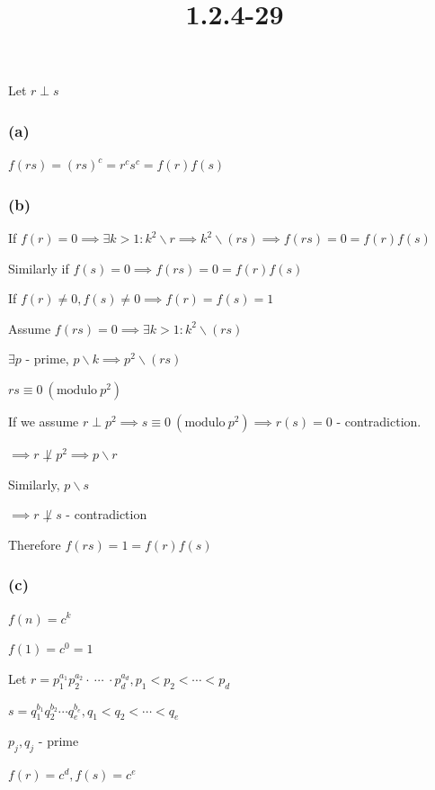 \documentclass{article}
\title{1.2.4-29}
\begin{document}
\maketitle

Let \( r \perp s \)

\subsubsection*{(a)}

\( f(rs) = (rs)^c=r^cs^c = f(r)f(s) \)

\subsubsection*{(b)}

If \( f(r) = 0 \implies \exists k > 1: k^2 \backslash r \implies k^2 \backslash (rs) \implies f(rs) = 0 = f(r)f(s) \)

Similarly if \( f(s) = 0 \implies f(rs) = 0 = f(r)f(s) \)

If \( f(r) \neq 0, f(s) \neq 0 \implies f(r)=f(s)=1 \)

Assume \( f(rs) = 0 \implies \exists k > 1: k^2 \backslash (rs) \)

\( \exists p \) - prime, \( p \backslash k \implies p^2 \backslash (rs) \)

\( rs \equiv 0 \ (\mathrm{modulo}\ p^2) \)

If we assume \( r \perp p^2 \implies s \equiv 0 \ (\mathrm{modulo}\ p^2) \implies r(s) = 0 \) - contradiction.

\( \implies r \not\perp p^2 \implies p \backslash r \)

Similarly, \( p \backslash s \)

\( \implies r \not\perp s \) - contradiction

Therefore \( f(rs) = 1 = f(r)f(s) \)

\subsubsection*{(c)}

\( f(n) = c^k \)

\( f(1) = c^0 = 1 \)

Let \( r = p_1^{a_1} p_2^{a_2} \cdot\ \cdots\ \cdot p_d^{a_d}, p_1 < p_2 < \cdots < p_d \)

\( s = q_1^{b_1} q_2^{b_2} \cdots q_e^{b_e}, q_1 < q_2 < \cdots < q_e \)

\( p_j, q_j \) - prime

\( f(r) = c^d, f(s)=c^e \)
\end{document}
